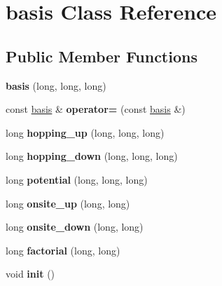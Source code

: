 \hypertarget{classbasis}{}\section{basis Class Reference}
\label{classbasis}
\subsection*{Public Member Functions}
\begin{DoxyCompactItemize}
\item 
{\bfseries basis} (long, long, long)\hypertarget{classbasis_ad982d3f0be65c05675cdc0efb00252a1}{}\label{classbasis_ad982d3f0be65c05675cdc0efb00252a1}

\item 
const \hyperlink{classbasis}{basis} \& {\bfseries operator=} (const \hyperlink{classbasis}{basis} \&)\hypertarget{classbasis_a0c6e641dfcb8827c4412e581fa4c8bfa}{}\label{classbasis_a0c6e641dfcb8827c4412e581fa4c8bfa}

\item 
long {\bfseries hopping\+\_\+up} (long, long, long)\hypertarget{classbasis_ad81055daddd429c17d3d8ec8df98c564}{}\label{classbasis_ad81055daddd429c17d3d8ec8df98c564}

\item 
long {\bfseries hopping\+\_\+down} (long, long, long)\hypertarget{classbasis_aabd03a8b22fc17da971a9cb9345a9ff9}{}\label{classbasis_aabd03a8b22fc17da971a9cb9345a9ff9}

\item 
long {\bfseries potential} (long, long, long)\hypertarget{classbasis_a64bb5f4caae7c3fc68bf788638c38276}{}\label{classbasis_a64bb5f4caae7c3fc68bf788638c38276}

\item 
long {\bfseries onsite\+\_\+up} (long, long)\hypertarget{classbasis_af150181d5a345a54732c7fe67b0dacc6}{}\label{classbasis_af150181d5a345a54732c7fe67b0dacc6}

\item 
long {\bfseries onsite\+\_\+down} (long, long)\hypertarget{classbasis_aaddb33fcac06a345845896b3f6114dbd}{}\label{classbasis_aaddb33fcac06a345845896b3f6114dbd}

\item 
long {\bfseries factorial} (long, long)\hypertarget{classbasis_a01aa1995b52a74c6415c123a8deceb83}{}\label{classbasis_a01aa1995b52a74c6415c123a8deceb83}

\item 
void {\bfseries init} ()\hypertarget{classbasis_ae335f2b871ce8fad7a5b8e3cab7c4f71}{}\label{classbasis_ae335f2b871ce8fad7a5b8e3cab7c4f71}


\end{DoxyCompactItemize}
